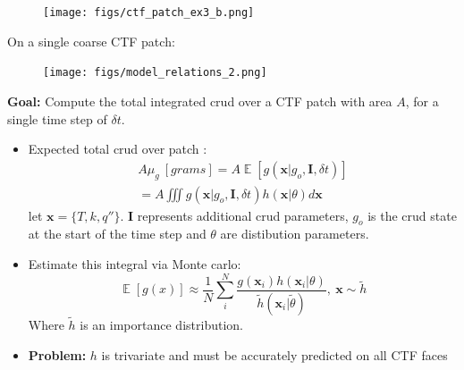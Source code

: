 \documentclass[t, pdftex]{beamer}
\DeclareMathOperator*{\E}{\mathbb{E}}
\begin{document}
\begin{frame}
\begin{figure}[!htbp]
\centering
\texttt{[image: figs/ctf\_patch\_ex3\_b.png]}
\label{model_overview}
\end{figure}
\end{frame}

\begin{frame}
On a single coarse CTF patch:
\begin{figure}[!htbp]
\centering
\texttt{[image: figs/model\_relations\_2.png]}
\label{model_overview}
\end{figure}
\end{frame}

\begin{frame}
\textbf{Goal:} Compute the total integrated crud over a CTF patch with area $A$, for a single time step of $\delta t$.
\begin{itemize}
	\item Expected total crud over patch : 
	\begin{eqnarray}
		A \mu_g\ [grams] = A \E[g(\mathbf x|g_o, \mathbf I, \delta t)] \nonumber \\
		= A \iiint g(\mathbf x|g_o, \mathbf I, \delta t) h(\mathbf x|\theta) d \mathbf x  \nonumber
	\end{eqnarray}
	let $\mathbf x= \{T, k, q''\}$.
	$\mathbf I$ represents additional crud parameters, $g_o$ is the crud state at the start of the time step and $\theta$ are distibution parameters.
	\item Estimate this integral via Monte carlo:
	\[
	\E[g(x)] \approx \frac{1}{N} \sum_i^N \frac{g(\mathbf x_i) 
	h(\mathbf x_i | \theta)}{\tilde h(\mathbf x_i | \tilde \theta)}, \ \mathbf x \sim \tilde h
	\]
	Where $\tilde h$ is an importance distribution. 
    \item \textbf{Problem:} $h$ is trivariate and must be accurately predicted on all CTF faces
\end{itemize}
\end{frame}


\end{document}
